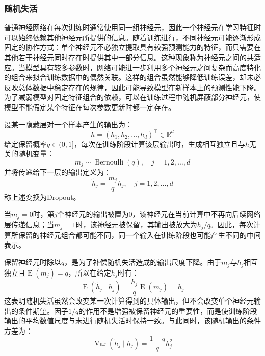 \subsubsection{随机失活}
普通神经网络在每次训练时通常使用同一组神经元，因此一个神经元在学习特征时可以始终依赖其他神经元所提供的信息。随着训练进行，不同神经元可能逐渐形成固定的协作方式：单个神经元不必独立提取具有较强预测能力的特征，而只需要在其他若干神经元同时存在时提供其中一部分信息。这种现象称为神经元之间的共适应。当模型具有较多参数时，网络可能进一步利用多个神经元之间复杂而高度特化的组合来拟合训练数据中的偶然关联。这样的组合虽然能够降低训练误差，却未必反映总体数据中稳定存在的规律，因此可能导致模型在新样本上的预测性能下降。为了减弱模型对固定特征组合的依赖，可以在训练过程中随机屏蔽部分神经元，使模型不能假定某个特征在每次参数更新时都一定存在。
\begin{definition}
	设某一隐藏层对一个样本产生的输出为：
	\begin{equation*}
		h=(h_1,h_2,\dots,h_d)^{\top}\in\mathbb{R}^d
	\end{equation*}
	给定保留概率$q\in(0,1]$，每次在训练阶段计算该层输出时，生成相互独立且与$h$无关的随机变量：
	\begin{equation*}
		m_j\sim\operatorname{Bernoulli}(q),\quad j=1,2,\dots,d
	\end{equation*}
	并将传递给下一层的输出定义为：
	\begin{equation*}
		\tilde{h}_j=\frac{m_j}{q}h_j,\quad j=1,2,\dots,d
	\end{equation*}
	称上述变换为\gls{Dropout}。
\end{definition}
当$m_j=0$时，第$j$个神经元的输出被置为$0$，该神经元在当前计算中不再向后续网络层传递信息；当$m_j=1$时，该神经元被保留，其输出被放大为$h_j/q$。因此，每次计算所保留的神经元组合都可能不同，同一个输入在训练阶段也可能产生不同的中间表示。\par
保留神经元时除以$q$，是为了补偿随机失活造成的输出尺度下降。由于$m_j$与$h_j$相互独立且$\operatorname{E}(m_j)=q$，所以在给定$h_j$时有：
\begin{equation*}
	\operatorname{E}(\tilde{h}_j\mid h_j)=\frac{h_j}{q}\operatorname{E}(m_j)=h_j
\end{equation*}
这表明随机失活虽然会改变某一次计算得到的具体输出，但不会改变单个神经元输出的条件期望。因子$1/q$的作用不是增强被保留神经元的重要性，而是使训练阶段输出的平均数值尺度与未进行随机失活时保持一致。与此同时，该随机输出的条件方差为：
\begin{equation*}
	\operatorname{Var}(\tilde{h}_j\mid h_j)=\frac{1-q}{q}h_j^2
\end{equation*}
